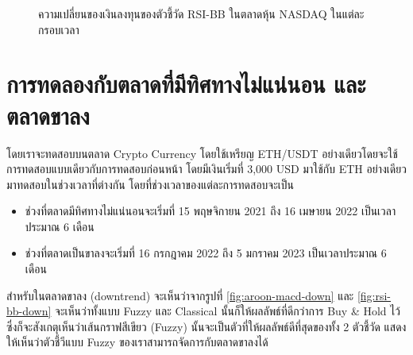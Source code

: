\begin{figure}[!ht]
    \centering
    \caption{ความเปลี่ยนของเงินลงทุนของตัวชี้วัด RSI-BB ในตลาดหุ้น NASDAQ ในแต่ละกรอบเวลา}
    \label{fig:rsi-bb-stock-all}
\end{figure}

\section{การทดลองกับตลาดที่มีทิศทางไม่แน่นอน และตลาดขาลง}
โดยเราจะทดสอบบนตลาด Crypto Currency โดยใช้เหรียญ ETH/USDT อย่างเดียวโดยจะใช้การทดสอบแบบเดียวกับการทดสอบก่อนหน้า โดยมีเงินเริ่มที่ 3,000 USD มาใช้กับ ETH อย่างเดียวมาทดสอบในช่วงเวลาที่ต่างกัน โดยที่ช่วงเวลาของแต่ละการทดสอบจะเป็น
\begin{itemize}
    \item ช่วงที่ตลาดมีทิศทางไม่แน่นอนจะเริ่มที่ 15 พฤษจิกายน 2021 ถึง 16 เมษายน 2022 เป็นเวลาประมาณ 6 เดือน
    \item ช่วงที่ตลาดเป็นขาลงจะเริ่มที่ 16 กรกฎาคม 2022 ถึง 5 มกราคม 2023 เป็นเวลาประมาณ 6 เดือน
\end{itemize}
สำหรับในตลาดขาลง (downtrend) จะเห็นว่าจากรูปที่ \ref{fig:aroon-macd-down} และ \ref{fig:rsi-bb-down} จะเห็นว่าทั้งแบบ Fuzzy และ Classical นั้นก็ให้ผลลัพธ์ที่ดีกว่าการ Buy \& Hold ไว้ซึ่งก็จะสังเกตุเห็นว่าเส้นกราฟสีเขียว (Fuzzy) นั้นจะเป็นตัวที่ให้ผลลัพธ์ดีที่สุดของทั้ง 2 ตัวชี้วัด แสดงให้เห็นว่าตัวชี้วีแบบ Fuzzy ของเราสามารถจัดการกับตลาดขาลงได้

